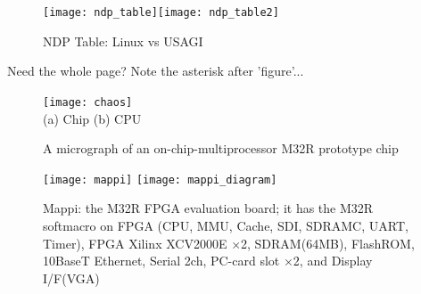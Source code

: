 
\begin{figure}[tb]
 \begin{center}
  \texttt{[image: ndp\_table]}\texttt{[image: ndp\_table2]}
 \end{center}
 \caption{NDP Table: Linux vs USAGI\label{ndp_table}}
\end{figure}

Need the whole page?  Note the asterisk after 'figure'...

\begin{figure*}[t]
\begin{center}
\texttt{[image: chaos]} \ \\
(a) Chip \hspace{3cm} (b) CPU
\caption{A micrograph of an on-chip-multiprocessor M32R prototype chip}
\label{chaos}
\end{center}
\end{figure*}


\begin{figure*}
\begin{center}
\begin{minipage}{16cm}
\begin{center}
\texttt{[image: mappi]}
\hspace{1cm}
\texttt{[image: mappi\_diagram]}
\end{center}
\end{minipage}
\caption{Mappi: the M32R FPGA evaluation board; it has the M32R
softmacro on FPGA (CPU, MMU, Cache, SDI, SDRAMC, UART, Timer), FPGA
Xilinx XCV2000E $\times$2, SDRAM(64MB), FlashROM, 10BaseT Ethernet,
Serial 2ch, PC-card slot $\times$2, and Display I/F(VGA)} \label{mappi}
\end{center}
\end{figure*}



